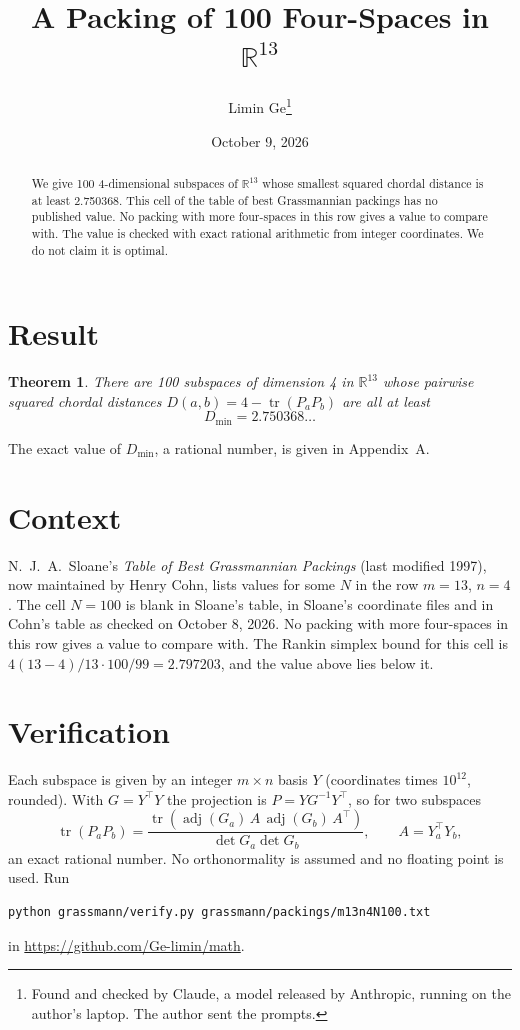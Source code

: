 \documentclass[11pt,a4paper]{article}
\title{A Packing of 100 Four-Spaces in $\mathbb{R}^{13}$}
\author{Limin Ge\thanks{Found and checked by Claude, a model released by Anthropic, running on the author's laptop. The author sent the prompts.}}
\date{October 9, 2026}
\newtheorem*{theorem}{Theorem}
\begin{document}
\maketitle
\begin{abstract}
We give 100 4-dimensional subspaces of $\mathbb{R}^{13}$ whose smallest squared chordal distance is at least 2.750368. This cell of the table of best Grassmannian packings has no published value. No packing with more four-spaces in this row gives a value to compare with. The value is checked with exact rational arithmetic from integer coordinates. We do not claim it is optimal.
\end{abstract}

\section{Result}
\begin{theorem}
There are 100 subspaces of dimension 4 in $\mathbb{R}^{13}$ whose pairwise squared chordal distances $D(a,b) = 4 - \operatorname{tr}(P_aP_b)$ are all at least
\[ D_{\min} = 2.750368\ldots \]
\end{theorem}
The exact value of $D_{\min}$, a rational number, is given in Appendix~A.


\section{Context}
N.~J.~A.~Sloane's \emph{Table of Best Grassmannian Packings} (last modified 1997), now maintained by Henry Cohn, lists values for some $N$ in the row $m=13$, $n=4$. The cell $N=100$ is blank in Sloane's table, in Sloane's coordinate files and in Cohn's table as checked on October 8, 2026. No packing with more four-spaces in this row gives a value to compare with. The Rankin simplex bound for this cell is $4(13-4)/13\cdot 100/99 = 2.797203$, and the value above lies below it.


\section{Verification}
Each subspace is given by an integer $m\times n$ basis $Y$ (coordinates times $10^{12}$, rounded). With $G=Y^\top Y$ the projection is $P=YG^{-1}Y^\top$, so for two subspaces
\[ \operatorname{tr}(P_aP_b)=\frac{\operatorname{tr}(\operatorname{adj}(G_a)\,A\,\operatorname{adj}(G_b)\,A^\top)}{\det G_a\det G_b},\qquad A=Y_a^\top Y_b, \]
an exact rational number. No orthonormality is assumed and no floating point is used. Run
\begin{verbatim}
python grassmann/verify.py grassmann/packings/m13n4N100.txt
\end{verbatim}
in \url{https://github.com/Ge-limin/math}.
\end{document}
